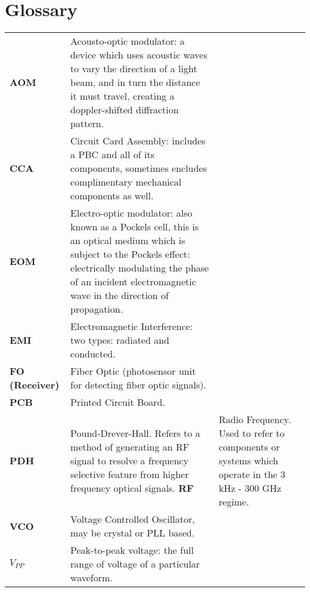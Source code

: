 \newpage
\section*{Glossary}

\begin{tabularx}{\linewidth}{lX}
  {\bf AOM} & Acousto-optic modulator: a device which uses acoustic waves to vary the direction of a light beam, and in turn the distance it must travel, creating a doppler-shifted diffraction pattern. \\
  {\bf CCA} & Circuit Card Assembly: includes a PBC and all of its components,
  sometimes encludes complimentary mechanical components as well. \\
  {\bf EOM} & Electro-optic modulator: also known as a Pockels cell, this
  is an optical medium which is subject to the Pockels effect: electrically
  modulating the phase of an incident electromagnetic wave in the direction
  of propagation.\\
  {\bf EMI} & Electromagnetic Interference: two types: radiated and conducted.\\
  {\bf FO (Receiver)} & Fiber Optic (photosensor unit for detecting fiber optic
  signals).  \\
  {\bf PCB} & Printed Circuit Board. \\
  {\bf PDH} & Pound-Drever-Hall. Refers to a method of generating an RF signal to resolve a frequency selective feature from higher frequency optical signals.
  {\bf RF} & Radio Frequency. Used to refer to components or systems which
  operate in the 3 kHz - 300 GHz regime. \\
  {\bf VCO} & Voltage Controlled Oscillator, may be crystal or PLL based. \\
  {\bf $V_{PP}$} & Peak-to-peak voltage: the full range of voltage of a
  particular waveform.
\end{tabularx}
